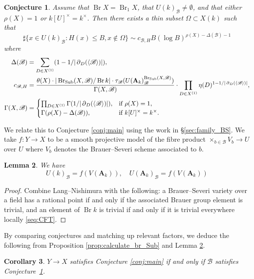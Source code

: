 \documentclass[a4paper,12pt,reqno]{amsart}
\numberwithin{equation}{section} \numberwithin{figure}{section}
\DeclareMathOperator{\Br}{Br} \DeclareMathOperator{\Brnr}{Br_{nr}}
\newcommand{\Adele}{\mathbf{A}}
\newcommand{\br}{\mathscr{B}}
\renewcommand{\leq}{\leqslant}
\renewcommand{\#}{\sharp}
\newtheorem{lemma}{Lemma}
\newtheorem{conjecture}[lemma]{Conjecture}
\newtheorem{corollary}[lemma]{Corollary}
\theoremstyle{definition}
\numberwithin{lemma}{section}
\begin{document}
\begin{conjecture} \label{conj:Br}
	Assume that $\Br X = \Br_1 X$, that $U(k)_\br \neq \emptyset$,
	and that either $\rho(X) = 1$ or $k[U]^\times =k^\times$.
	Then there exists a thin subset $\Omega \subset X(k)$ such that
	$$\#\{ x \in U(k)_\br : H(x) \leq B, x \notin \Omega \} 
	\sim c_{\br,H} B(\log B)^{\rho(X)  - \Delta(\br) - 1}$$
	where
	\begin{align*}
	\Delta(\br) & = \sum_{D \in X^{(1)}} ( 1 - 1/|\res_D(\langle\br\rangle)|), \\
		c_{\br,H} &= \frac{\theta(X) \cdot |\Sub(X,\br)/\Br k| \cdot  \tau_\br(U(\Adele_k)_\br^{\Sub(X,\br)})}
	{\Gamma(X,\br)} \cdot  
	\prod_{D \in X^{(1)}}\eta(D)^{1- 1/|\res_D(\langle\br\rangle)|}, \\
	\Gamma(X,\br) &= 
	\begin{cases}
		\prod_{D \in X^{(1)}}\Gamma(1/|\res_D(\langle\br\rangle)|) , & \text{if } \rho(X) = 1, \\
		\Gamma( \rho(X) - \Delta(\br)), & \text{if }k[U]^\times = k^\times.
	\end{cases}
	\end{align*}
\end{conjecture}

We relate this to Conjecture \ref{conj:main} using the work in \S \ref{sec:family_BS}.
We take $f:Y \to X$ to be a smooth projective model of the fibre product $\times_{b \in \br} V_b \to U$ over $U$ where $V_b$ denotes the Brauer--Severi scheme associated to $b$.

\begin{lemma} \label{lem:Lang-Nishimura}
	We have
	$$U(k)_\br = f(V(\Adele_k)), \quad U(\Adele_k)_\br = f(V(\Adele_k))$$
\end{lemma}
\begin{proof}
Combine Lang--Nishimura with the following: a Brauer--Severi variety
over a field has a rational point if and only if the associated Brauer group element is trivial, and an element of $\Br k$ is trivial if and only if it is trivial everywhere locally \eqref{seq:CFT}.
\end{proof}

By comparing conjectures and matching up relevant factors, we deduce the following from Proposition \ref{prop:calculate_br_Sub} and Lemma \ref{lem:Lang-Nishimura}.

\begin{corollary} \label{cor:sub}
	$Y \to X$ satisfies Conjecture \ref{conj:main}  if and only if $\br$
	satisfies Conjecture~\ref{conj:Br}.
\end{corollary}
\end{document}

